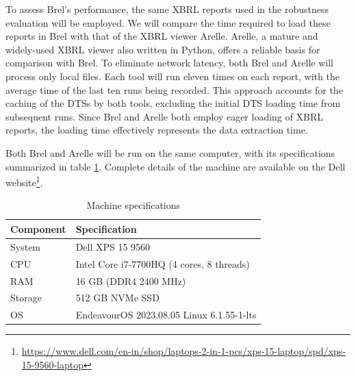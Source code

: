 To assess Brel's performance, the same XBRL reports used in the robustness evaluation will be employed.
We will compare the time required to load these reports in Brel
with that of the XBRL viewer Arelle\cite{arelle}.
Arelle, a mature and widely-used XBRL viewer also written in Python,
offers a reliable basis for comparison with Brel.
To eliminate network latency, both Brel and Arelle will process only local files.
Each tool will run eleven times on each report, with the average time of the last ten runs being recorded.
This approach accounts for the caching of the DTSs by both tools,
excluding the initial DTS loading time from subsequent runs.
Since Brel and Arelle both employ eager loading of XBRL reports,
the loading time effectively represents the data extraction time.

Both Brel and Arelle will be run on the same computer,
with its specifications summarized in table \ref{tab:machine-specs}.
Complete details of the machine are available on the Dell website\footnote{\url{https://www.dell.com/en-in/shop/laptops-2-in-1-pcs/xps-15-laptop/spd/xps-15-9560-laptop}}.

\begin{table}[H]
    \centering
    \begin{tabular}{|l|l|}
        \hline
        \textbf{Component} & \textbf{Specification} \\
        \hline
        System & Dell XPS 15 9560 \\
        CPU & Intel Core i7-7700HQ (4 cores, 8 threads) \\
        RAM & 16 GB (DDR4 2400 MHz) \\
        Storage & 512 GB NVMe SSD \\
        OS & EndeavourOS 2023.08.05 Linux 6.1.55-1-lts \\
        \hline
    \end{tabular}
    \caption{Machine specifications}
    \label{tab:machine-specs}
\end{table}



